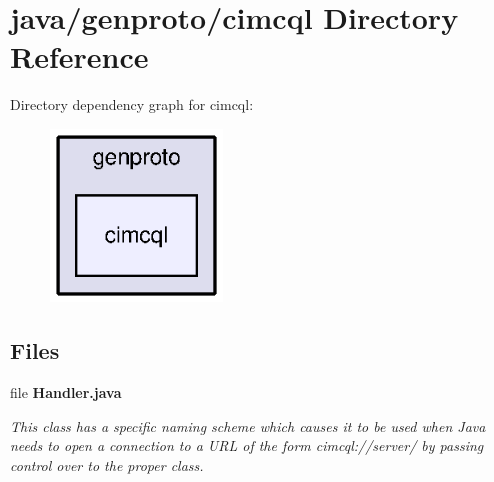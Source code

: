 \section{java/genproto/cimcql Directory Reference}
\label{dir_5c5f5170099a0ff00a58e67a9cac939f}
Directory dependency graph for cimcql\+:
\nopagebreak
\begin{figure}[H]
\begin{center}
\leavevmode
\includegraphics[width=130pt]{dir_5c5f5170099a0ff00a58e67a9cac939f_dep}
\end{center}
\end{figure}
\subsection*{Files}
\begin{DoxyCompactItemize}
\item 
file {\bf Handler.\+java}
\begin{DoxyCompactList}\small\item\em This class has a specific naming scheme which causes it to be used when Java needs to open a connection to a U\+R\+L of the form cimcql\+://server/ by passing control over to the proper class. \end{DoxyCompactList}\end{DoxyCompactItemize}
